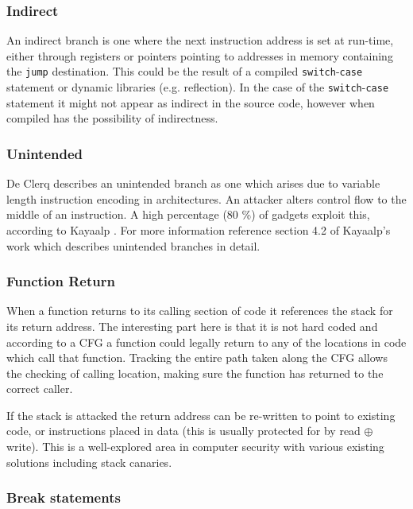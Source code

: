 \subsubsection{Indirect}
An indirect branch is one where the next instruction address is set at run-time, either through registers or pointers pointing to addresses in memory containing the \verb|jump| destination. This could be the result of a compiled \verb|switch|-\verb|case| statement or dynamic libraries (e.g. reflection). In the case of the \verb|switch|-\verb|case| statement it might not appear as indirect in the source code, however when compiled has the possibility of indirectness.


\subsubsection{Unintended}
De Clerq \cite{DeClercq2017} describes an unintended branch as one which arises due to variable length instruction encoding in architectures. An attacker alters control flow to the middle of an instruction. A high percentage (80 \%) of gadgets exploit this, according to Kayaalp \cite{Kayaalp2014}. For more information reference section 4.2 of Kayaalp’s work \cite{Kayaalp2014} which describes unintended branches in detail. 

\subsubsection{Function Return}
When a function returns to its calling section of code it references the stack for its return address. The interesting part here is that it is not hard coded and according to a CFG a function could legally return to any of the locations in code which call that function. Tracking the entire path taken along the CFG allows the checking of calling location, making sure the function has returned to the correct caller.

If the stack is attacked the return address can be re-written to point to existing code, or instructions placed in data (this is usually protected for by read $\oplus$ write). This is a well-explored area in computer security with various existing solutions including stack canaries.

\subsubsection{Break statements}

